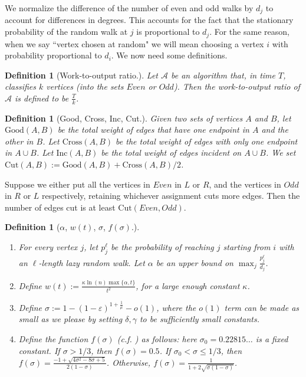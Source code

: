 \documentclass[11pt]{article}
\newtheorem{Def}[theorem]{Definition}
\def\epsilon{\varepsilon}
\newcommand\good{\textrm{Good}}
\newcommand\cross{\textrm{Cross}}
\newcommand\inc{\textrm{Inc}}
\newcommand\cut{\textrm{Cut}}
\newcommand\soto{f\xspace}
\begin{document}
We normalize the difference of the number of even and odd walks by $d_j$ to
account for differences in degrees. This accounts for the fact that the
stationary probability of the random walk at $j$ is proportional to $d_j$. For
the same reason, when we say ``vertex chosen at random" we will mean choosing a
vertex $i$ with probability proportional to $d_i$. We now need some definitions.
\begin{Def}[Work-to-output ratio.]
Let $\mathcal{A}$ be an algorithm that, in time $T$, classifies $k$ vertices (into the sets $Even$ or $Odd$). Then the work-to-output ratio of $\mathcal{A}$ is defined to be $\frac{T}{k}$.
\end{Def}
\begin{Def}[\good, \cross, \inc, \cut.] \label{def:cut}
Given two sets of vertices $A$ and $B$, let $\good(A,B)$ be the total weight of edges that have one endpoint in $A$ and the other in $B$. Let $\cross(A,B)$ be the total weight of edges with only one endpoint in $A \cup B$. Let $\inc(A,B)$ be the total weight of edges incident on $A \cup B$. We set $\cut(A,B) := \good(A,B) + \cross(A,B)/2$.
\end{Def}

Suppose we either put all the vertices in $Even$ in $L$ or $R$, and the vertices in
$Odd$ in $R$ or $L$ respectively, retaining whichever assignment cuts more
edges. Then the number of edges cut is at least $\cut(Even, Odd)$.



\begin{Def}[$\alpha$, $w(t)$, $\sigma$, $\soto(\sigma)$.] \label{def:alpha-sigma-etc}
\begin{enumerate}
    \item For every vertex $j$, let $p^\ell_j$ be the probability of reaching $j$
    starting from $i$ with an $\ell$-length lazy random walk.
    Let $\alpha$ be an upper bound on $\max_j \frac{p^\ell_j}{d_j}$.

    \item Define $w(t) := \frac{\kappa \ln(n)\max\{\alpha, t\}}{t^2}$, for a large enough constant $\kappa$.

    \item Define $\sigma := 1 - (1 - \epsilon)^{1 + \frac{1}{\mu}} - o(1)$, where the $o(1)$ term can be made as small as we please by setting $\delta, \gamma$ to be sufficiently small constants.

    \item Define the function $\soto(\sigma)$ (c.f. \cite{Sot09})
as follows: here $\sigma_0 = 0.22815\ldots$ is a fixed constant. If $\sigma
    > 1/3$, then  $\soto(\sigma) = 0.5$. If $\sigma_0 < \sigma \leq 1/3$, then
    $\soto(\sigma) =  \frac{-1+\sqrt{4\sigma^2 - 8\sigma + 5}}{2(1-\sigma)}$.
    Otherwise, $\soto(\sigma) = \frac{1}{1+2\sqrt{\sigma(1-\sigma)}}$.
\end{enumerate}
\end{Def}
\end{document}
